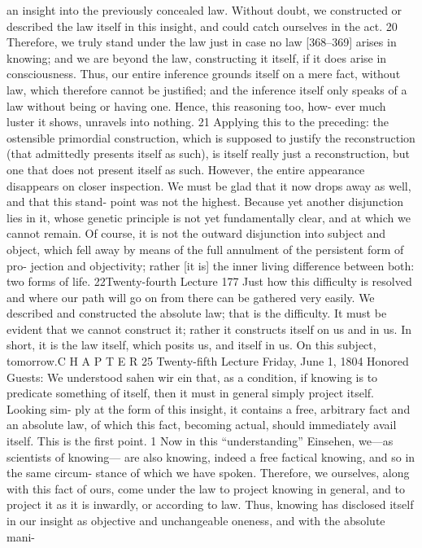 an insight into the previously concealed law. Without doubt, we constructed
or described the law itself in this insight, and could catch ourselves in the act. 20
Therefore, we truly stand under the law just in case no law [368–369]
arises in knowing; and we are beyond the law, constructing it itself, if it does
arise in consciousness. Thus, our entire inference grounds itself on a mere fact,
without law, which therefore cannot be justified; and the inference itself only
speaks of a law without being or having one. Hence, this reasoning too, how-
ever much luster it shows, unravels into nothing. 21
Applying this to the preceding: the ostensible primordial construction,
which is supposed to justify the reconstruction (that admittedly presents itself
as such), is itself really just a reconstruction, but one that does not present
itself as such. However, the entire appearance disappears on closer inspection.
We must be glad that it now drops away as well, and that this stand-
point was not the highest. Because yet another disjunction lies in it, whose
genetic principle is not yet fundamentally clear, and at which we cannot
remain. Of course, it is not the outward disjunction into subject and object,
which fell away by means of the full annulment of the persistent form of pro-
jection and objectivity; rather [it is] the inner living difference between both:
two forms of life. 22Twenty-fourth Lecture
177
Just how this difficulty is resolved and where our path will go on from
there can be gathered very easily. We described and constructed the absolute
law; that is the difficulty. It must be evident that we cannot construct it; rather
it constructs itself on us and in us. In short, it is the law itself, which posits us,
and itself in us. On this subject, tomorrow.C H A P T E R
25
Twenty-fifth Lecture
Friday, June 1, 1804
Honored Guests:
We understood {sahen wir ein} that, as a condition, if knowing is to predicate
something of itself, then it must in general simply project itself. Looking sim-
ply at the form of this insight, it contains a free, arbitrary fact and an absolute
law, of which this fact, becoming actual, should immediately avail itself. This
is the first point. 1
Now in this “understanding” {Einsehen}, we—as scientists of knowing—
are also knowing, indeed a free factical knowing, and so in the same circum-
stance of which we have spoken. Therefore, we ourselves, along with this fact
of ours, come under the law to project knowing in general, and to project it as
it is inwardly, or according to law. Thus, knowing has disclosed itself in our
insight as objective and unchangeable oneness, and with the absolute mani-
